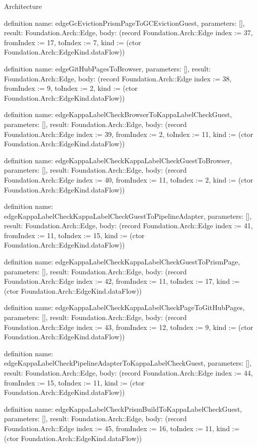 \begin{lexlean}{Architecture}
\begin{semanticmodule}
definition{
  name: edgeGcEvictionPrismPageToGCEvictionGuest,
  parameters: [],
  result: Foundation.Arch::Edge,
  body: (record Foundation.Arch::Edge {index := 37, fromIndex := 17, toIndex := 7, kind := (ctor Foundation.Arch::EdgeKind.dataFlow)})
}

definition{
  name: edgeGitHubPagesToBrowser,
  parameters: [],
  result: Foundation.Arch::Edge,
  body: (record Foundation.Arch::Edge {index := 38, fromIndex := 9, toIndex := 2, kind := (ctor Foundation.Arch::EdgeKind.dataFlow)})
}

definition{
  name: edgeKappaLabelCheckBrowserToKappaLabelCheckGuest,
  parameters: [],
  result: Foundation.Arch::Edge,
  body: (record Foundation.Arch::Edge {index := 39, fromIndex := 2, toIndex := 11, kind := (ctor Foundation.Arch::EdgeKind.dataFlow)})
}

definition{
  name: edgeKappaLabelCheckKappaLabelCheckGuestToBrowser,
  parameters: [],
  result: Foundation.Arch::Edge,
  body: (record Foundation.Arch::Edge {index := 40, fromIndex := 11, toIndex := 2, kind := (ctor Foundation.Arch::EdgeKind.dataFlow)})
}

definition{
  name: edgeKappaLabelCheckKappaLabelCheckGuestToPipelineAdapter,
  parameters: [],
  result: Foundation.Arch::Edge,
  body: (record Foundation.Arch::Edge {index := 41, fromIndex := 11, toIndex := 15, kind := (ctor Foundation.Arch::EdgeKind.dataFlow)})
}

definition{
  name: edgeKappaLabelCheckKappaLabelCheckGuestToPrismPage,
  parameters: [],
  result: Foundation.Arch::Edge,
  body: (record Foundation.Arch::Edge {index := 42, fromIndex := 11, toIndex := 17, kind := (ctor Foundation.Arch::EdgeKind.dataFlow)})
}

definition{
  name: edgeKappaLabelCheckKappaLabelCheckPageToGitHubPages,
  parameters: [],
  result: Foundation.Arch::Edge,
  body: (record Foundation.Arch::Edge {index := 43, fromIndex := 12, toIndex := 9, kind := (ctor Foundation.Arch::EdgeKind.dataFlow)})
}

definition{
  name: edgeKappaLabelCheckPipelineAdapterToKappaLabelCheckGuest,
  parameters: [],
  result: Foundation.Arch::Edge,
  body: (record Foundation.Arch::Edge {index := 44, fromIndex := 15, toIndex := 11, kind := (ctor Foundation.Arch::EdgeKind.dataFlow)})
}

definition{
  name: edgeKappaLabelCheckPrismBuildToKappaLabelCheckGuest,
  parameters: [],
  result: Foundation.Arch::Edge,
  body: (record Foundation.Arch::Edge {index := 45, fromIndex := 16, toIndex := 11, kind := (ctor Foundation.Arch::EdgeKind.dataFlow)})
}


\end{semanticmodule}
\end{lexlean}

